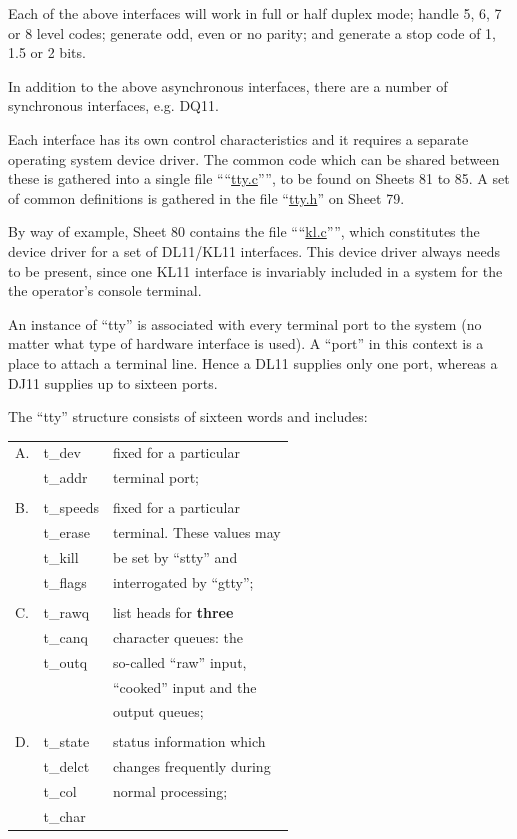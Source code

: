 Each of the above interfaces will work
in full or half duplex mode; handle 5,
6, 7 or 8 level codes; generate odd,
even or no parity; and generate a stop
code of 1, 1.5 or 2 bits.

In addition to the above asynchronous
interfaces, there are a number of synchronous interfaces, e.g. DQ11.

Each interface has its own control
characteristics and it requires a
separate operating system device
driver. The common code which can be
shared between these is gathered into a
single file ````\href{./v6/dmr/tty.c}{tty.c}'''', to be found on
Sheets 81 to 85. A set of common definitions is gathered in the file ``\href{./v6/tty.h}{tty.h}''
on Sheet 79.

By way of example, Sheet 80 contains
the file ````\href{./v6/dmr/kl.c}{kl.c}'''', which constitutes the
device driver for a set of DL11/KL11
interfaces. This device driver always
needs to be present, since one KL11
interface is invariably included in a
system for the the operator's console
terminal.


An instance of ``tty'' is associated with
every terminal port to the system (no
matter what type of hardware interface
is used). A ``port'' in this context is a
place to attach a terminal line. Hence
a DL11 supplies only one port, whereas
a DJ11 supplies up to sixteen ports.

The ``tty'' structure consists of sixteen
words and includes:

\noindent\begin{tabular}{lll}\\
A. & t\_dev & fixed for a particular \\
   & t\_addr & terminal port;\\
\\
B. &  t\_speeds & fixed for a particular \\
  & t\_erase & terminal. These values may \\
  & t\_kill & be set by ``stty'' and \\
  & t\_flags & interrogated by ``gtty''; \\
 \\
C. & t\_rawq & list heads for {\bf three} \\
  & t\_canq & character queues: the \\
  & t\_outq & so-called ``raw'' input, \\
 & & ``cooked'' input and the \\
 & & output queues; \\
 \\
D. & t\_state & status information which \\
  & t\_delct & changes frequently during \\
  & t\_col & normal processing; \\
  & t\_char & \\
\end{tabular}

